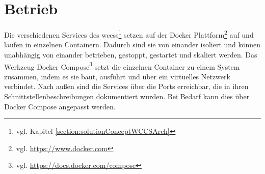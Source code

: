 \section{Betrieb}
    Die verschiedenen Services des
    \glspl{wccs}\footnote{vgl. Kapitel \ref{section:solutionConceptWCCSArch}}
    setzen auf der Docker Plattform\footnote{vgl. \url{https://www.docker.com}} auf
    und laufen in einzelnen Containern.
    Dadurch sind sie von einander isoliert und können unabhängig von einander
    betrieben, gestoppt, gestartet und skaliert werden.
    Das Werkzeug Docker Compose\footnote{vgl. \url{https://docs.docker.com/compose}}
    setzt die einzelnen Container zu einem System zusammen,
    indem es sie baut, ausführt und über ein virtuelles Netzwerk verbindet.
    Nach außen sind die Services über die Ports erreichbar,
    die in ihren Schnittstellenbeschreibungen dokumentiert wurden.
    Bei Bedarf kann dies über Docker Compose angepasst werden.
